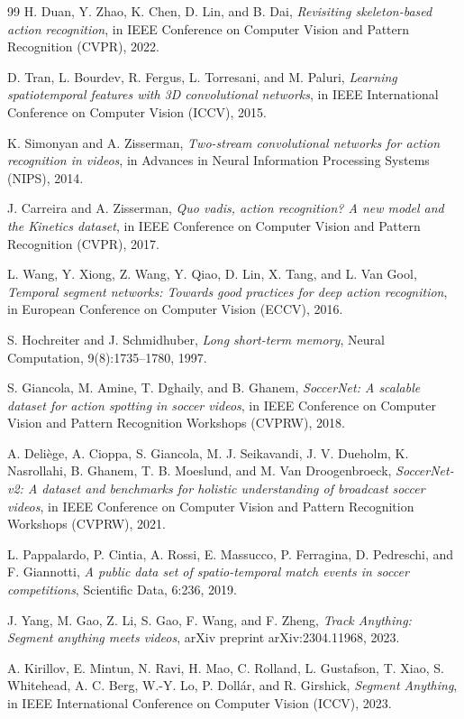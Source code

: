 \begin{thebibliography}{99}
H. Duan, Y. Zhao, K. Chen, D. Lin, and B. Dai,
\textit{Revisiting skeleton-based action recognition},
in IEEE Conference on Computer Vision and Pattern Recognition (CVPR), 2022.

D. Tran, L. Bourdev, R. Fergus, L. Torresani, and M. Paluri,
\textit{Learning spatiotemporal features with 3D convolutional networks},
in IEEE International Conference on Computer Vision (ICCV), 2015.

K. Simonyan and A. Zisserman,
\textit{Two-stream convolutional networks for action recognition in videos},
in Advances in Neural Information Processing Systems (NIPS), 2014.

J. Carreira and A. Zisserman,
\textit{Quo vadis, action recognition? A new model and the Kinetics dataset},
in IEEE Conference on Computer Vision and Pattern Recognition (CVPR), 2017.

L. Wang, Y. Xiong, Z. Wang, Y. Qiao, D. Lin, X. Tang, and L. Van Gool,
\textit{Temporal segment networks: Towards good practices for deep action recognition},
in European Conference on Computer Vision (ECCV), 2016.

S. Hochreiter and J. Schmidhuber,
\textit{Long short-term memory},
Neural Computation, 9(8):1735--1780, 1997.

S. Giancola, M. Amine, T. Dghaily, and B. Ghanem,
\textit{SoccerNet: A scalable dataset for action spotting in soccer videos},
in IEEE Conference on Computer Vision and Pattern Recognition Workshops (CVPRW), 2018.

A. Deliège, A. Cioppa, S. Giancola, M. J. Seikavandi, J. V. Dueholm, K. Nasrollahi, B. Ghanem, T. B. Moeslund, and M. Van Droogenbroeck,
\textit{SoccerNet-v2: A dataset and benchmarks for holistic understanding of broadcast soccer videos},
in IEEE Conference on Computer Vision and Pattern Recognition Workshops (CVPRW), 2021.

L. Pappalardo, P. Cintia, A. Rossi, E. Massucco, P. Ferragina, D. Pedreschi, and F. Giannotti,
\textit{A public data set of spatio-temporal match events in soccer competitions},
Scientific Data, 6:236, 2019.

J. Yang, M. Gao, Z. Li, S. Gao, F. Wang, and F. Zheng,
\textit{Track Anything: Segment anything meets videos},
arXiv preprint arXiv:2304.11968, 2023.

A. Kirillov, E. Mintun, N. Ravi, H. Mao, C. Rolland, L. Gustafson, T. Xiao, S. Whitehead, A. C. Berg, W.-Y. Lo, P. Dollár, and R. Girshick,
\textit{Segment Anything},
in IEEE International Conference on Computer Vision (ICCV), 2023.


\end{thebibliography}
